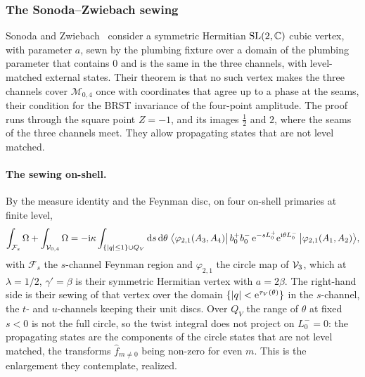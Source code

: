 \subsubsection{The Sonoda--Zwiebach sewing}
\label{sec:wscircle:sz}


Sonoda and Zwiebach~\cite{Sonoda:1990:CovariantClosedString} consider a symmetric Hermitian $\mathrm{SL}(2, \mathbb{C})$ cubic vertex, with parameter $a$, sewn by the plumbing fixture over a domain of the plumbing parameter that contains $0$ and is the same in the three channels, with level-matched external states.
Their theorem is that no such vertex makes the three channels cover $\mathcal M_{0,4}$ once with coordinates that agree up to a phase at the seams, their condition for the BRST invariance of the four-point amplitude.
The proof runs through the square point $Z = - 1$, and its images $\tfrac{1}{2}$ and $2$, where the seams of the three channels meet.
They allow propagating states that are not level matched.

\paragraph{The sewing on-shell.}
By the measure identity and the Feynman disc, on four on-shell primaries at finite level,
\begin{equation}
  \label{eq:wscircle:sz-sewing}
  \int_{\mathcal F_s} \Omega + \int_{\mathcal V_{0,4}} \Omega
    = - \mathrm{i} \kappa \int_{\{ {|q|} \leq 1 \} \cup Q_V} \mathrm{d} s \, \mathrm{d}\theta \; \big\langle \varphi_{2,1}(A_3, A_4) \big| \, b_0^+ b_0^- \, \mathrm{e}^{- s L_0^+} \mathrm{e}^{\mathrm{i} \theta L_0^-} \, \big| \varphi_{2,1}(A_1, A_2) \big\rangle,
\end{equation}
with $\mathcal F_s$ the $s$-channel Feynman region and $\varphi_{2,1}$ the circle map of $\mathcal{V}_{3}$, which at $\lambda = 1 / 2$, $\gamma' = \beta$ is their symmetric Hermitian vertex with $a = 2 \beta$.
The right-hand side is their sewing of that vertex over the domain $\{ {|q|} < \mathrm{e}^{\tau_V(\theta)} \}$ in the $s$-channel, the $t$- and $u$-channels keeping their unit discs.
Over $Q_V$ the range of $\theta$ at fixed $s < 0$ is not the full circle, so the twist integral does not project on $L_0^- = 0$: the propagating states are the components of the circle states that are not level matched, the transforms $\hat f_{m \neq 0}$ being non-zero for even $m$.
This is the enlargement they contemplate, realized.

